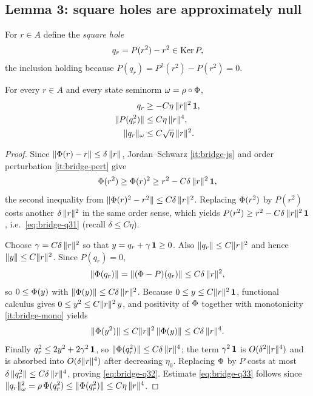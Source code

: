 \subsection*{Lemma 3: square holes are approximately null}

For $r\in A$ define the \emph{square hole}
\[
  q_r=P(r^2)-r^2\in\operatorname{Ker} P,
\]
the inclusion holding because $P(q_r)=P^2(r^2)-P(r^2)=0$.

\begin{lemma}\label{lem:bridge-squarehole}
For every $r\in A$ and every state seminorm $\omega=\rho\circ\Phi$,
\begin{align}
  q_r&\ge-C\eta\,\lVert r \rVert^2\,\mathbf{1}, \label{eq:bridge-q31}\\
  \lVert P(q_r^2) \rVert&\le C\eta\,\lVert r \rVert^4, \label{eq:bridge-q32}\\
  \lVert q_r \rVert_\omega&\le C\sqrt\eta\,\lVert r \rVert^2. \label{eq:bridge-q33}
\end{align}
\end{lemma}

\begin{proof}
Since $\lVert \Phi(r)-r \rVert\le\delta\,\lVert r \rVert$, Jordan--Schwarz \ref{it:bridge-js}
and order perturbation \ref{it:bridge-pert} give
\[
  \Phi(r^2)\ge\Phi(r)^2\ge r^2-C\delta\,\lVert r \rVert^2\,\mathbf{1},
\]
the second inequality from $\lVert \Phi(r)^2-r^2 \rVert\le C\delta\,\lVert r \rVert^2$.
Replacing $\Phi(r^2)$ by $P(r^2)$ costs another $\delta\,\lVert r \rVert^2$ in the
same order sense, which yields $P(r^2)\ge r^2-C\delta\,\lVert r \rVert^2\,\mathbf{1}$, i.e.\
\eqref{eq:bridge-q31} (recall $\delta\le C\eta$).

Choose $\gamma=C\delta\,\lVert r \rVert^2$ so that $y=q_r+\gamma\,\mathbf{1}\ge0$. Also
$\lVert q_r \rVert\le C\lVert r \rVert^2$ and hence $\lVert y \rVert\le C\lVert r \rVert^2$. Since
$P(q_r)=0$,
\[
  \lVert \Phi(q_r) \rVert=\lVert (\Phi-P)(q_r) \rVert\le C\delta\,\lVert r \rVert^2,
\]
so $0\le\Phi(y)$ with $\lVert \Phi(y) \rVert\le C\delta\,\lVert r \rVert^2$. Because
$0\le y\le C\lVert r \rVert^2\,\mathbf{1}$, functional calculus gives
$0\le y^2\le C\lVert r \rVert^2\,y$, and positivity of $\Phi$ together with
monotonicity \ref{it:bridge-mono} yields
\[
  \lVert \Phi(y^2) \rVert\le C\lVert r \rVert^2\,\lVert \Phi(y) \rVert\le C\delta\,\lVert r \rVert^4.
\]
Finally $q_r^2\le2y^2+2\gamma^2\,\mathbf{1}$, so
$\lVert \Phi(q_r^2) \rVert\le C\delta\,\lVert r \rVert^4$; the term $\gamma^2\,\mathbf{1}$ is
$O(\delta^2\lVert r \rVert^4)$ and is absorbed into $O(\delta\lVert r \rVert^4)$ after
decreasing $\eta_0$. Replacing $\Phi$ by $P$ costs at most
$\delta\,\lVert q_r^2 \rVert\le C\delta\,\lVert r \rVert^4$, proving \eqref{eq:bridge-q32}.
Estimate \eqref{eq:bridge-q33} follows since
$\lVert q_r \rVert_\omega^2=\rho\,\Phi(q_r^2)\le\lVert \Phi(q_r^2) \rVert\le C\eta\,\lVert r \rVert^4$.
\end{proof}

